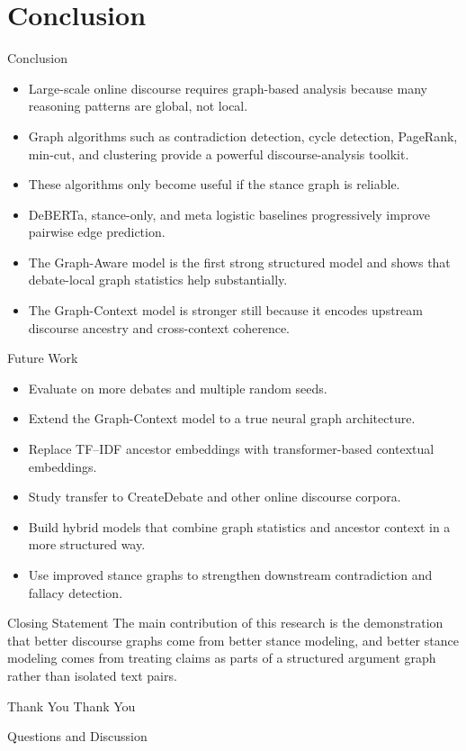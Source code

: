 \documentclass[aspectratio=169, 10pt]{beamer}
\begin{document}
\section{Conclusion}

\begin{frame}{Conclusion}
\begin{itemize}
  \item Large-scale online discourse requires graph-based analysis because many reasoning patterns are global, not local.
  \item Graph algorithms such as contradiction detection, cycle detection, PageRank, min-cut, and clustering provide a powerful discourse-analysis toolkit.
  \item These algorithms only become useful if the stance graph is reliable.
  \item DeBERTa, stance-only, and meta logistic baselines progressively improve pairwise edge prediction.
  \item The Graph-Aware model is the first strong structured model and shows that debate-local graph statistics help substantially.
  \item The Graph-Context model is stronger still because it encodes upstream discourse ancestry and cross-context coherence.
\end{itemize}
\end{frame}

\begin{frame}{Future Work}
\begin{itemize}
  \item Evaluate on more debates and multiple random seeds.
  \item Extend the Graph-Context model to a true neural graph architecture.
  \item Replace TF--IDF ancestor embeddings with transformer-based contextual embeddings.
  \item Study transfer to CreateDebate and other online discourse corpora.
  \item Build hybrid models that combine graph statistics and ancestor context in a more structured way.
  \item Use improved stance graphs to strengthen downstream contradiction and fallacy detection.
\end{itemize}

\begin{block}{Closing Statement}
The main contribution of this research is the demonstration that better discourse graphs come from better stance modeling, and better stance modeling comes from treating claims as parts of a structured argument graph rather than isolated text pairs.
\end{block}
\end{frame}

\begin{frame}{Thank You}
\centering
\Huge Thank You

\vspace{1em}
\Large Questions and Discussion
\end{frame}
\end{document}
